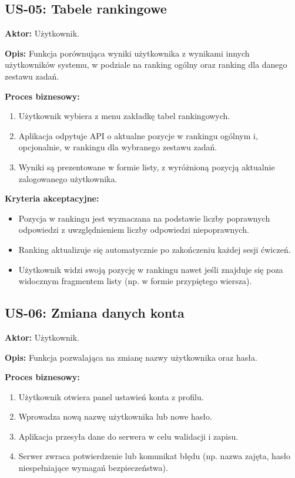 \documentclass[polish]{aghengthesis}
\begin{document}

\subsection{US-05: Tabele rankingowe}
\textbf{Aktor:} Użytkownik.

\textbf{Opis:} Funkcja porównująca wyniki użytkownika z wynikami innych
użytkowników systemu, w podziale na ranking ogólny oraz ranking dla danego
zestawu zadań.

\textbf{Proces biznesowy:}
\begin{enumerate}
    \item Użytkownik wybiera z menu zakładkę tabel rankingowych.
    \item Aplikacja odpytuje API o aktualne pozycje w rankingu ogólnym
    i, opcjonalnie, w rankingu dla wybranego zestawu zadań.
    \item Wyniki są prezentowane w formie listy, z wyróżnioną pozycją
    aktualnie zalogowanego użytkownika.
\end{enumerate}

\textbf{Kryteria akceptacyjne:}
\begin{itemize}
    \item Pozycja w rankingu jest wyznaczana na podstawie liczby poprawnych
    odpowiedzi z uwzględnieniem liczby odpowiedzi niepoprawnych.
    \item Ranking aktualizuje się automatycznie po zakończeniu każdej sesji
    ćwiczeń.
    \item Użytkownik widzi swoją pozycję w rankingu nawet jeśli znajduje się
    poza widocznym fragmentem listy (np. w formie przypiętego wiersza).
\end{itemize}

\subsection{US-06: Zmiana danych konta}
\textbf{Aktor:} Użytkownik.

\textbf{Opis:} Funkcja pozwalająca na zmianę nazwy użytkownika oraz hasła.

\textbf{Proces biznesowy:}
\begin{enumerate}
    \item Użytkownik otwiera panel ustawień konta z profilu.
    \item Wprowadza nową nazwę użytkownika lub nowe hasło.
    \item Aplikacja przesyła dane do serwera w celu walidacji i zapisu.
    \item Serwer zwraca potwierdzenie lub komunikat błędu (np. nazwa zajęta,
    hasło niespełniające wymagań bezpieczeństwa).
\end{enumerate}
\end{document}
